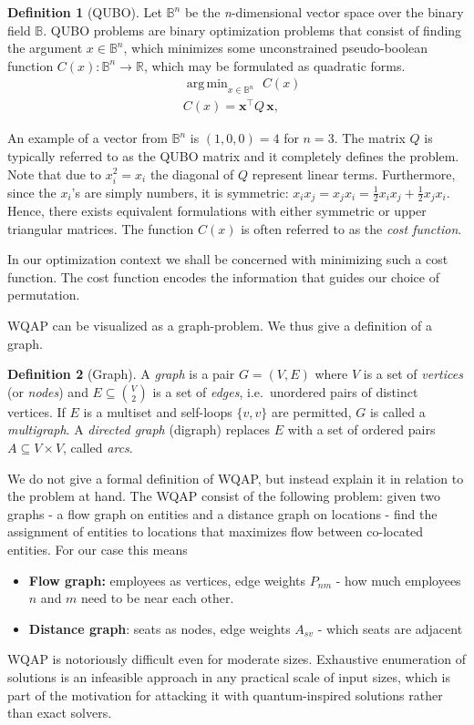 \documentclass[10pt]{article}
\DeclareMathOperator*{\argmin}{arg\,min}
\theoremstyle{definition}
\newtheorem{definition}{Definition}[section]
\theoremstyle{plain}
\theoremstyle{remark}
\begin{document}
	\begin{definition}[QUBO]
		Let $\mathbb{B}^n$ be the \textit{n}-dimensional vector space over the binary field $\mathbb {B}$. QUBO problems are binary optimization problems that consist of finding the argument $x\in\mathbb{B}^n$, which minimizes some unconstrained pseudo-boolean function $C(x): \mathbb{B}^n\rightarrow\mathbb{R}$,
		which may be formulated as quadratic forms. 
		\begin{align}
			& \argmin_{x\in\mathbb{B}^n}\,\, C(x) \\
			& C(x) = \mathbf{x}^\top Q\, \mathbf{x}, 
		\end{align}
	\end{definition}
	An example of a vector from $\mathbb{B}^n$ is $(1, 0, 0) = 4$ for $n=3$. The matrix $Q$ is typically referred to as the QUBO matrix and it completely defines the problem. Note that due to $x_i^2 = x_i$ the diagonal of $Q$ represent linear terms. Furthermore, since the $x_i$'s are simply numbers, it is symmetric: $x_ix_j = x_jx_i = \frac12x_ix_j + \frac12x_jx_i$. Hence, there exists equivalent formulations with either symmetric or upper triangular matrices. The function $C(x)$ is often referred to as the \emph{cost function}. 
	
	In our optimization context we shall be concerned with minimizing such a cost function. The cost function encodes the information that guides our choice of permutation. 
	
	WQAP can be visualized as a graph-problem. We thus give a definition of a graph.	
	
	\begin{definition}[Graph]
		A \emph{graph} is a pair $G = (V, E)$ where $V$ is a set of \emph{vertices} (or \emph{nodes})
		and $E \subseteq \binom{V}{2}$ is a set of \emph{edges}, i.e.\ unordered pairs of distinct
		vertices. If $E$ is a multiset and self-loops $\{v,v\}$ are permitted, $G$ is called a
		\emph{multigraph}. A \emph{directed graph} (digraph) replaces $E$ with a set of ordered pairs
		$A \subseteq V \times V$, called \emph{arcs}.
	\end{definition}
	
	We do not give a formal definition of WQAP, but instead explain it in relation to the problem at hand. The WQAP consist of the following problem: given two graphs - a flow graph on entities and a distance graph on locations - find the assignment of entities to locations that maximizes flow between co-located entities. For our case this means
	\begin{itemize}
		\item \textbf{Flow graph:} employees as vertices, edge weights $P_{nm}$ - how much employees $n$ and $m$ need to be near each other.
		\item \textbf{Distance graph}: seats as nodes, edge weights $A_{sv}$ - which seats are adjacent
	\end{itemize}
	WQAP is notoriously difficult even for moderate sizes. Exhaustive enumeration of solutions is an infeasible approach in any practical scale of input sizes, which is part of the motivation for attacking it with quantum-inspired solutions rather than exact solvers.
	
\end{document}
